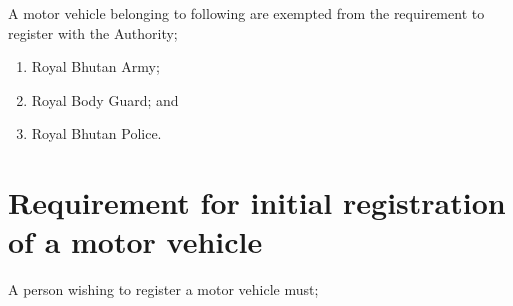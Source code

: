 \documentclass[
]{book}
\providecommand{\tightlist}{%
  \setlength{\itemsep}{0pt}\setlength{\parskip}{0pt}}
\begin{document}
A motor vehicle belonging to following are exempted from the requirement to register with the Authority;

\begin{enumerate}
\def\labelenumi{\alph{enumi}.}
\tightlist
\item
  Royal Bhutan Army;
\item
  Royal Body Guard; and
\item
  Royal Bhutan Police.
\end{enumerate}

\hypertarget{requirement-for-initial-registration-of-a-motor-vehicle}{%
\section{Requirement for initial registration of a motor vehicle}\label{requirement-for-initial-registration-of-a-motor-vehicle}}

A person wishing to register a motor vehicle must;
\end{document}
